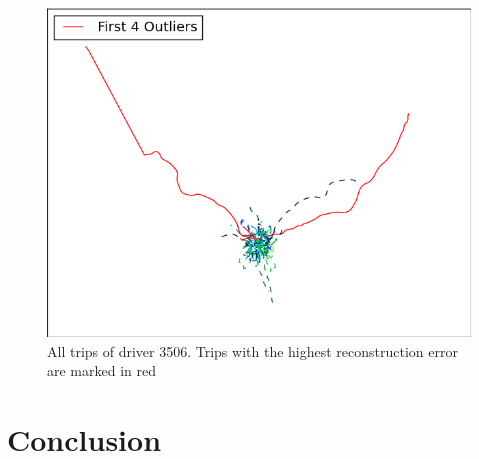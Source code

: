 \documentclass{vldb}
\begin{document}
\begin{figure}
\centering
\includegraphics[width=0.8\linewidth]{"pics/outliers_junk/D_3506"}
\caption{All trips of driver 3506. Trips with the highest reconstruction error are marked in red}
\label{fig:d-3506}
\end{figure}

\section{Conclusion}
\label{sec:Conclusion}
\end{document}
